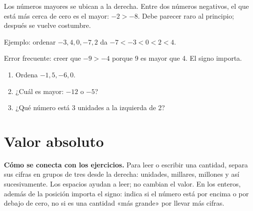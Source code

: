 \documentclass[10pt,oneside,openany]{book}
\begin{document}
Los números mayores se ubican a la derecha. Entre dos números negativos, el que está más cerca de cero es el mayor: $-2>-8$. Debe parecer raro al principio; después se vuelve costumbre.

\begin{ejemplo}
Ejemplo: ordenar $-3, 4, 0, -7, 2$ da $-7<-3<0<2<4$.
\end{ejemplo}

\begin{ojo}
Error frecuente: creer que $-9>-4$ porque 9 es mayor que 4. El signo importa.
\end{ojo}

\begin{practica}

\begin{enumerate}

\item Ordena $-1, 5, -6, 0$.

\item ¿Cuál es mayor: $-12$ o $-5$?

\item ¿Qué número está 3 unidades a la izquierda de 2?

\end{enumerate}

\end{practica}





\begin{center}
\end{center}

\section{Valor absoluto}

\textbf{Cómo se conecta con los ejercicios.} Para leer o escribir una cantidad, separa sus cifras en grupos de tres desde la derecha: unidades, millares, millones y así sucesivamente. Los espacios ayudan a leer; no cambian el valor. En los enteros, además de la posición importa el signo: indica si el número está por encima o por debajo de cero, no si es una cantidad «más grande» por llevar más cifras.
\end{document}
